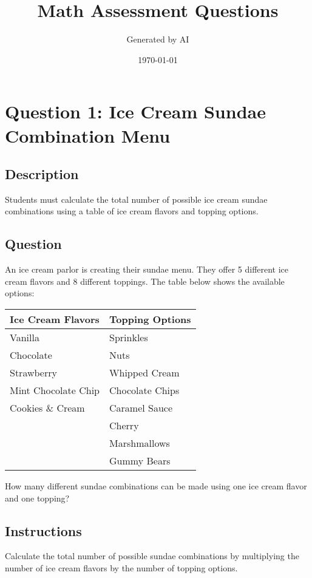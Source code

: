 \documentclass[12pt]{article}
\title{Math Assessment Questions}
\author{Generated by AI}
\date{\today}
\begin{document}
\maketitle

\section*{Question 1: Ice Cream Sundae Combination Menu}

\subsection*{Description}
Students must calculate the total number of possible ice cream sundae combinations using a table of ice cream flavors and topping options.

\subsection*{Question}
An ice cream parlor is creating their sundae menu. They offer 5 different ice cream flavors and 8 different toppings. The table below shows the available options:

\begin{center}
\begin{tabular}{ll}
\toprule
\textbf{Ice Cream Flavors} & \textbf{Topping Options} \\
\midrule
Vanilla & Sprinkles \\
Chocolate & Nuts \\
Strawberry & Whipped Cream \\
Mint Chocolate Chip & Chocolate Chips \\
Cookies \& Cream & Caramel Sauce \\
& Cherry \\
& Marshmallows \\
& Gummy Bears \\
\bottomrule
\end{tabular}
\end{center}

How many different sundae combinations can be made using one ice cream flavor and one topping?

\subsection*{Instructions}
Calculate the total number of possible sundae combinations by multiplying the number of ice cream flavors by the number of topping options.
\end{document}
